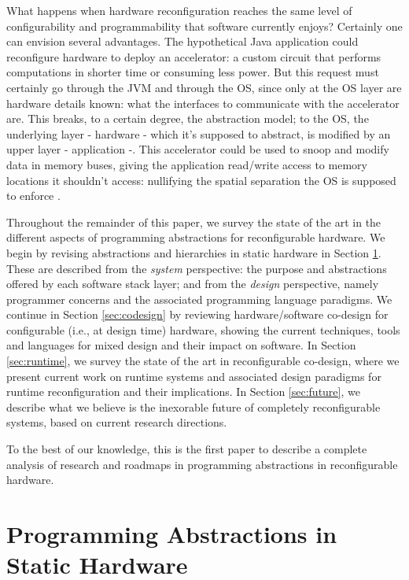 \par What happens when hardware reconfiguration reaches the same level of configurability and programmability that software currently enjoys? Certainly one can envision several advantages. The hypothetical Java application could reconfigure hardware to deploy an accelerator: a custom circuit that performs computations in shorter time or consuming less power. But this request must certainly go through the JVM and through the OS, since only at the OS layer are hardware details known: what the interfaces to communicate with the accelerator are. This breaks, to a certain degree, the abstraction model; to the OS, the underlying layer - hardware - which it's supposed to abstract, is modified by an upper layer - application -. This accelerator could be used to snoop and modify data in memory buses, giving the application read/write access to memory locations it shouldn't access: nullifying the spatial separation the OS is supposed to enforce \cite{}.
\par Throughout the remainder of this paper, we survey the state of the art in the different aspects of programming abstractions for reconfigurable hardware. We begin by revising abstractions and hierarchies in static hardware in Section \ref{sec:static}. These are described from the \textit{system} perspective: the purpose and abstractions offered by each software stack layer; and from the \textit{design} perspective, namely programmer concerns and the associated programming language paradigms. We continue in Section \ref{sec:codesign} by reviewing hardware/software co-design for configurable (i.e., at design time) hardware, showing the current techniques, tools and languages for mixed design and their impact on software. In Section \ref{sec:runtime}, we survey the state of the art in reconfigurable co-design, where we present current work on runtime systems and associated design paradigms for runtime reconfiguration and their implications. In Section \ref{sec:future}, we describe what we believe is the inexorable future of completely reconfigurable systems, based on current research directions.
\par To the best of our knowledge, this is the first paper to describe a complete analysis of research and roadmaps in programming abstractions in reconfigurable hardware. 


\section{Programming Abstractions in Static Hardware}\label{sec:static}

